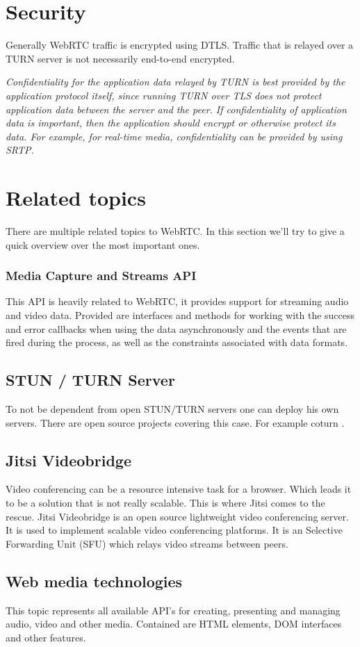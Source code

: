 \section{Security}
Generally WebRTC traffic is encrypted using DTLS. Traffic that is relayed over a TURN server is not necessarily end-to-end encrypted.

\textit{Confidentiality for the application data relayed by TURN is best provided by the application protocol itself, since running TURN over TLS does not protect application data between the server and the peer. If confidentiality of application data is important, then the application should encrypt or otherwise protect its data. For example, for real-time media, confidentiality can be provided by using SRTP.}~\cite{TURN:sec}

\section{Related topics}
There are multiple related topics to WebRTC. In this section we'll try to give a quick overview over the most important ones.

\subsubsection{Media Capture and Streams API}
This API is heavily related to WebRTC, it provides support for streaming audio and video data. Provided are interfaces and methods for working with the success and error callbacks when using the data asynchronously and the events that are fired during the process, as well as the constraints associated with data formats.

\subsection{STUN / TURN Server}
To not be dependent from open STUN/TURN servers one can deploy his own servers. There are open source projects covering this case. For example coturn \cite{coturn}.

\subsection{Jitsi Videobridge}
Video conferencing can be a resource intensive task for a browser. Which leads it to be a solution that is not really scalable. This is where Jitsi comes to the rescue. Jitsi Videobridge is an open source lightweight video conferencing server. It is used to implement scalable video conferencing platforms. It is an Selective Forwarding Unit (SFU) which relays video streams between peers.

\subsection{Web media technologies}
This topic represents all available API's for creating, presenting and managing audio, video and other media. Contained are HTML elements, DOM interfaces and other features.